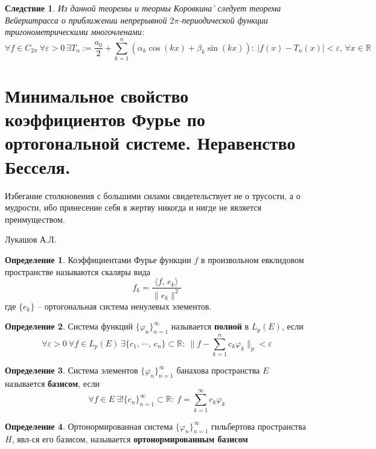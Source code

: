 \documentclass[a4paper,12pt]{article}
\renewcommand{\phi}{\ensuremath{\varphi}}
\theoremstyle{plain}
\newtheorem*{corollary}{Следствие}
\theoremstyle{definition}
\newtheorem{definition}{Определение}[section]
\theoremstyle{remark}
\begin{document}
\begin{corollary}
	Из данной теоремы и теормы Коровкина' следует теорема Вейерштрасса о приближении непрерывной $2\pi$-периодической функции тригонометрическими многочленами:
	\[\forall f \in C_{2\pi} \: \forall \varepsilon > 0 \: \exists T_n := \frac{a_0}{2} + \sum_{k = 1}^n (\alpha_k\cos(kx) + \beta_k\sin(kx)) :\: |f(x) - T_n(x)| < \varepsilon,\, \forall x \in \mathbb{R}\]
\end{corollary}

\section{Минимальное свойство коэффициентов Фурье по ортогональной системе. Неравенство Бесселя.}

\epigraph{Избегание столкновения с большими силами свидетельствует не о трусости, а о мудрости, ибо принесение себя в жертву никогда и нигде не является преимуществом.}{Лукашов А.Л.}

\begin{definition}
	Коэффициентами Фурье функции $f$ в произвольном евклидовом пространстве называются скаляры вида
	\[f_k = \frac{\langle f,\,e_k\rangle}{\|e_k\|^2}\]
	где $\{e_k\}$ -- ортогональная система ненулевых элементов.
\end{definition}

\begin{definition}
	Система функций $\{\phi_n\}_{n = 1}^\infty$ называется \textbf{полной} в $L_p(E)$, если
	\[\forall \varepsilon > 0 \: \forall f \in L_p(E) \: \exists \{c_1,\,\cdots,\,c_n\} \subset \mathbb{R}:\: \|f - \sum_{k = 1}^n c_k\phi_k\|_p < \varepsilon\]
\end{definition}

\begin{definition}
	Система элементов $\{\phi_n\}_{n = 1}^\infty$ банахова пространства $E$ называется \textbf{базисом}, если
	\[\forall f \in E \: \exists! \{c_n\}_{n = 1}^\infty \subset \mathbb{R}:\: f = \sum_{k = 1}^\infty c_k\phi_k\]
\end{definition}

\begin{definition}
	Ортонормированная система $\{\phi_n\}_{n = 1}^\infty$ гильбертова пространства $H$, явл-ся его базисом, называется \textbf{ортонормированным базисом}
\end{definition}
\end{document}
